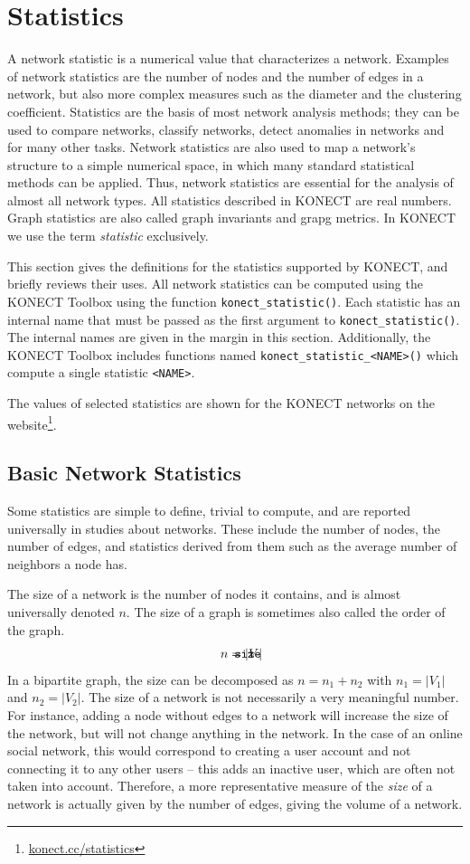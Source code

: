 \documentclass{article}
\def\mathnote#1{%
  \tag*{\rlap{\hspace\marginparsep\smash{\parbox[t]{\marginparwidth}{#1}}}}
}
\begin{document}
\section{Statistics}
\label{sec:statistics}
A network statistic is a numerical value that characterizes a network.
Examples of network statistics are the number of nodes and the number of
edges in a network, but also more complex measures such as the diameter and the
clustering coefficient.  
Statistics are the basis of most network analysis methods; they can be
used to compare networks, classify networks, detect anomalies in
networks and for many other tasks.  Network statistics are also used to
map a network's structure 
to a simple numerical space, in which many standard statistical
methods can be applied.  Thus, network statistics are essential for the
analysis of almost all network types. 
All statistics described in KONECT are real numbers.
Graph statistics are also called graph invariants and grapg metrics.  In
KONECT we use the term \emph{statistic} exclusively. 

This section gives the definitions for the statistics supported by
KONECT, and briefly reviews their uses.  
All network statistics can be computed using the KONECT Toolbox using
the function \texttt{konect\_statistic()}. Each statistic has an
internal name that must be passed as the first argument to
\texttt{konect\_statistic()}.  The internal names are given in the
margin in this section. 
Additionally, the KONECT Toolbox includes functions named
\texttt{konect\_statistic\_<NAME>()} which compute a single statistic
\texttt{<NAME>}. 

The values of selected statistics are
shown for the KONECT networks on the
website\footnote{\href{http://konect.cc/statistics/}{konect.cc/statistics}}.  

\subsection{Basic Network Statistics}
Some statistics are simple to define, trivial to compute, and 
are reported universally in studies about networks.  These include the
number of nodes, the number of edges, and statistics derived from them
such as the average number of neighbors a node has.  

The size of a network is the number of nodes it contains, and
is almost universally denoted $n$.  The size of a graph is sometimes also
called the order of the graph. 
\begin{align}
  \mathnote{\texttt{size}}
  n &= |V|
\end{align}
In a bipartite graph, the size can be decomposed as $n = n_1 + n_2$ with
$n_1 = |V_1|$ and $n_2=|V_2|$.  The size of a network is not necessarily
a very meaningful number.  For instance, adding a node without edges to
a network will increase the size of the network, but will not change
anything in the network. In the case of an online social
network, this would correspond to creating a user account and not
connecting it to any other users -- this adds an inactive user, which
are often not taken into account.  Therefore, a more representative
measure of the \emph{size} of a network is actually given by the number
of edges, giving the volume of a network.
\end{document}
